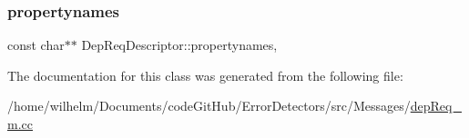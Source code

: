 \subsubsection{\texorpdfstring{propertynames}{propertynames}}
{\footnotesize\ttfamily const char$\ast$$\ast$ Dep\+Req\+Descriptor\+::propertynames\hspace{0.3cm}{\ttfamily [mutable]}, {\ttfamily [private]}}



The documentation for this class was generated from the following file\+:\begin{DoxyCompactItemize}
\item 
/home/wilhelm/\+Documents/code\+Git\+Hub/\+Error\+Detectors/src/\+Messages/\hyperlink{dep_req__m_8cc}{dep\+Req\+\_\+m.\+cc}\end{DoxyCompactItemize}
